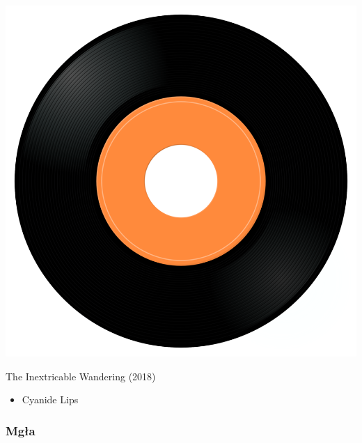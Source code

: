 \begin{minipage}[t]{0.25\textwidth}
\captionsetup{type=figure}
\includegraphics[width=\textwidth]{Images/cover.png}
\caption*{The Inextricable Wandering (2018)}
\end{minipage}
\begin{minipage}[t]{0.25\textwidth}\vspace{0pt}
\begin{itemize}[nosep,leftmargin=1em,labelwidth=*,align=left]
	\setlength{\itemsep}{0pt}
	\item Cyanide Lips
\end{itemize}
\end{minipage}

\subsubsection{Mgła}

